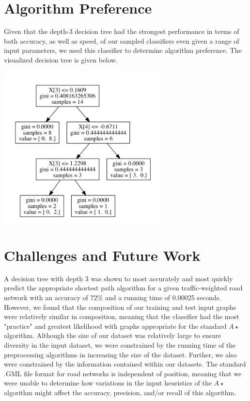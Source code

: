 \documentclass{article}
\begin{document}
\section{Algorithm Preference}

Given that the depth-3 decision tree had the strongest performance in terms of both accuracy, as well as speed, of our sampled classifiers even given a range of input parameters, we used this classifier to determine algorithm preference. The visualized decision tree is given below.

\includegraphics[width=8.5cm]{dtree_vis}

\section{Challenges and Future Work}

A decision tree with depth 3 was shown to most accurately and most quickly predict the appropriate shortest path algorithm for a given traffic-weighted road network with an accuracy of $72\%$ and a running time of 0.00025 seconds. However, we found that the composition of our training and test input graphs were relatively similar in composition, meaning that the classifier had the most "practice" and greatest likelihood with graphs appropriate for the standard $A\star$ algorithm. Although the size of our dataset was relatively large to ensure diversity in the input dataset, we were constrained by the running time of the preprocessing algorithms in increasing the size of the dataset. Further, we also were constrained by the information contained within our datasets. The standard .GML file format for road networks is independent of position, meaning that we were unable to determine how variations in the input heuristics of the $A\star$ algorithm might affect the accuracy, precision, and/or recall of this algorithm.
\end{document}
